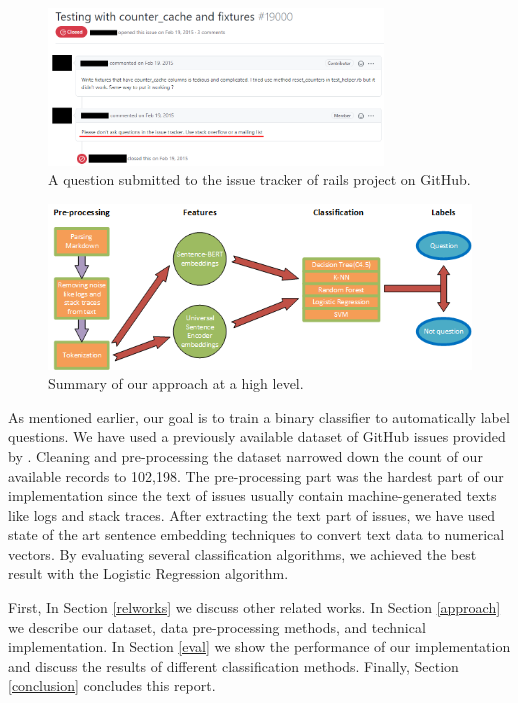 \documentclass[conference]{IEEEtran}
\begin{document}
\begin{figure}[t]
  \centerline{\includegraphics[width=3.5in]{./figures/q-issue.png}}
  \caption{A question submitted to the issue tracker of rails project on GitHub.}
  \label{fig:qissue}
\end{figure}

\begin{figure}[t]
  \centerline{\includegraphics{./figures/process.png}}
  \caption{Summary of our approach at a high level.}
  \label{fig:process}
\end{figure}

As mentioned earlier, our goal is to train a binary classifier to automatically label questions.
We have used a previously available dataset of GitHub issues provided by \cite{8816794}.
Cleaning and pre-processing the dataset narrowed down the count of our available 
records to 102,198. The pre-processing part was the hardest part of our implementation
since the text of issues usually contain machine-generated texts like logs and stack traces. 
After extracting the text part of issues, we have used state of the art sentence embedding techniques
to convert text data to numerical vectors. By evaluating several classification 
algorithms, we achieved the best result with the Logistic Regression algorithm.

First, In Section \ref{relworks} we discuss other related works. 
In Section \ref{approach} we describe our dataset, data pre-processing methods, 
and technical implementation. In Section \ref{eval} we show the performance of our implementation
and discuss the results of different classification methods.
Finally, Section \ref{conclusion} concludes this report.
\end{document}
